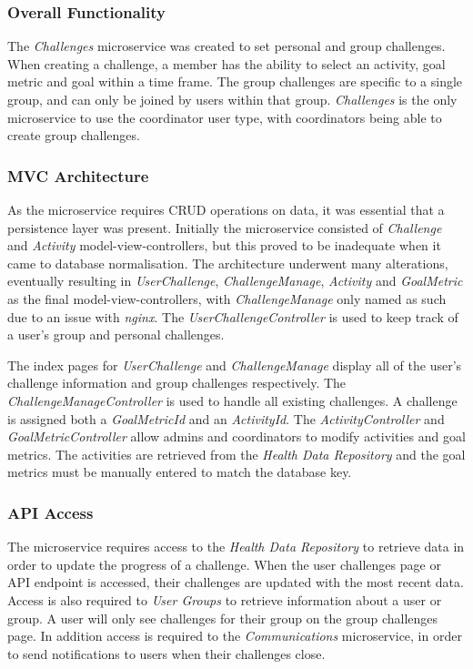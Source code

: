 \subsubsection{Overall Functionality}
\par
The \textit{Challenges} microservice was created to set personal and group challenges. When creating a challenge, a member has the ability to select an activity, goal metric and goal within a time frame. The group challenges are specific to a single group, and can only be joined by users within that group. \textit{Challenges} is the only microservice to use the coordinator user type, with coordinators being able to create group challenges. 

\subsubsection{MVC Architecture}
\par
As the microservice requires CRUD operations on data, it was essential that a persistence layer was present.
Initially the microservice consisted of \textit{Challenge} and \textit{Activity} model-view-controllers, but this proved to be inadequate when it came to database normalisation. The architecture underwent many alterations, eventually resulting in \textit{UserChallenge}, \textit{ChallengeManage}, \textit{Activity} and \textit{GoalMetric} as the final model-view-controllers, with \textit{ChallengeManage} only named as such due to an issue with \textit{nginx}. The \textit{UserChallengeController} is used to keep track of a user's group and personal challenges.

\par
The index pages for \textit{UserChallenge} and \textit{ChallengeManage} display all of the user's challenge information and group challenges respectively. The \textit{ChallengeManageController} is used to handle all existing challenges. A challenge is assigned both a \textit{GoalMetricId} and an \textit{ActivityId}. The \textit{ActivityController} and \textit{GoalMetricController} allow admins and coordinators to modify activities and goal metrics. The activities are retrieved from the \textit{Health Data Repository} and the goal metrics must be manually entered to match the database key.

\subsubsection{API Access}
\par
The microservice requires access to the \textit{Health Data Repository} to retrieve data in order to update the progress of a challenge. When the user challenges page or API endpoint is accessed, their challenges are updated with the most recent data.
Access is also required to \textit{User Groups} to retrieve information about a user or group. A user will only see challenges for their group on the group challenges page. 
In addition access is required to the \textit{Communications} microservice, in order to send notifications to users when their challenges close.

